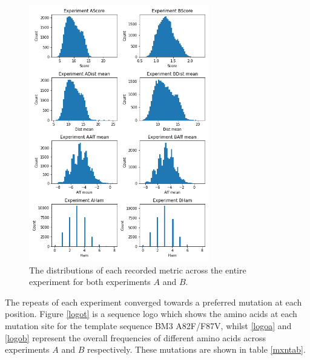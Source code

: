 \documentclass[16pt]{book}
\begin{document}
\begin{figure}
	\begin{center}
		\includegraphics[width=0.7\textwidth]{img/exp-a-b-compr-dists.png}
		\caption{\label{abdistr} The distributions of each recorded metric across the entire experiment for both experiments $A$ and $B$.}
	\end{center}
\end{figure}

The repeats of each experiment converged towards a preferred mutation at each position.
Figure \ref{logot} is a sequence logo which shows the amino acids at each mutation site for the template sequence BM3 A82F/F87V, whilst \ref{logoa} and \ref{logob} represent the overall frequencies of different amino acids across experiments $A$ and $B$ respectively.
These mutations are shown in table \ref{mxntab}.
\end{document}
